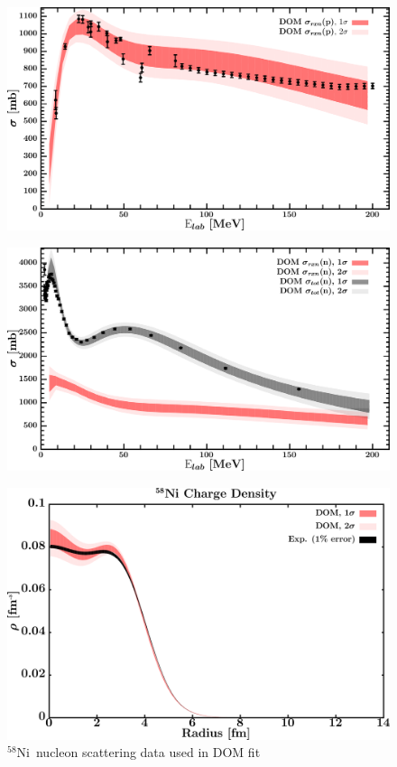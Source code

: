 \documentclass[twocolumn,secnumarabic,amssymb, nobibnotes, aps, prl,
superscriptaddress, nobalancelastpage]{revtex4}
\newcommand{\niEight}{\ensuremath{^{58}}N\lowercase{i}}
\begin{document}
\begin{figure}[!htb]
\begin{minipage}{0.4\linewidth}
        \label{DOM_ni58_neutron_elastic}
    \end{minipage}
    \centering
    \begin{minipage}{0.4\linewidth}
        \centering
        \includegraphics[width=\linewidth]{figures/ni58_protonInelastic.png}
        \label{DOM_ni58_proton_inelastic}
    \end{minipage}\hspace{6pt}
    \begin{minipage}{0.4\linewidth}
        \centering
        \includegraphics[width=\linewidth]{figures/ni58_neutronInelastic.png}
        \label{DOM_ni58_neutron_inelastic}
    \end{minipage}
    \caption{\niEight\ nucleon scattering data used in DOM fit}
    \label{DOM_ni58_scattering}
    \centering
    \begin{minipage}{0.4\linewidth}
        \centering
        \includegraphics[width=\linewidth]{figures/ni58_chargeDensity.png}

\end{minipage}
\end{figure}
\end{document}
